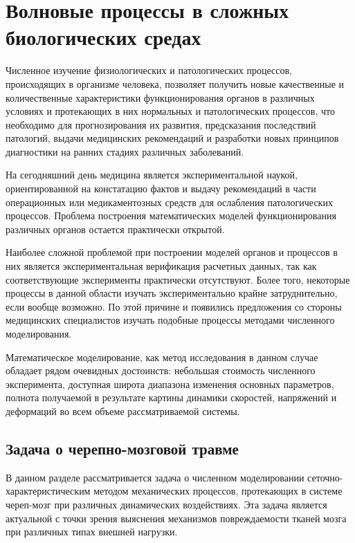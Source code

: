 \section{Волновые процессы в сложных биологических средах}

Численное изучение физиологических и патологических процессов, происходящих в организме человека, позволяет получить новые качественные и количественные характеристики функционирования органов в различных условиях и протекающих в них нормальных и патологических процессов, что необходимо для прогнозирования их развития, предсказания последствий патологий, выдачи медицинских рекомендаций и разработки новых принципов диагностики на ранних стадиях различных заболеваний.

На сегодняшний день медицина является экспериментальной наукой, ориентированной на констатацию фактов и выдачу рекомендаций в части операционных или медикаментозных средств для ослабления патологических процессов. Проблема построения математических моделей функционирования различных органов остается практически открытой.

Наиболее сложной проблемой при построении моделей органов и процессов в них является экспериментальная верификация расчетных данных, так как соответствующие эксперименты практически отсутствуют. Более того, некоторые процессы в данной области изучать экспериментально крайне затруднительно, если вообще возможно. По этой причине и появились предложения со стороны медицинских специалистов изучать подобные процессы методами численного моделирования.

Математическое моделирование, как метод исследования в данном случае обладает рядом очевидных достоинств: небольшая стоимость численного эксперимента, доступная широта диапазона изменения основных параметров, полнота получаемой в результате картины динамики скоростей, напряжений и деформаций во всем объеме рассматриваемой системы.

\clearpage
\newpage

\subsection{Задача о черепно-мозговой травме}

В данном разделе рассматривается задача о численном моделировании сеточно-характеристическим методом механических процессов, протекающих в системе череп-мозг при различных динамических воздействиях. Эта задача является актуальной с точки зрения выяснения механизмов повреждаемости тканей мозга при различных типах внешней нагрузки.

